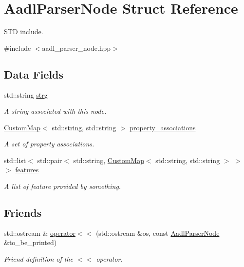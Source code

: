 \hypertarget{structAadlParserNode}{}\section{Aadl\+Parser\+Node Struct Reference}
\label{structAadlParserNode}


S\+TD include.  




{\ttfamily \#include $<$aadl\+\_\+parser\+\_\+node.\+hpp$>$}

\subsection*{Data Fields}
\begin{DoxyCompactItemize}
\item 
std\+::string \hyperlink{structAadlParserNode_a1818540477de82becd8229345b908343}{strg}
\begin{DoxyCompactList}\small\item\em A string associated with this node. \end{DoxyCompactList}\item 
\hyperlink{custom__map_8hpp_a18ca01763abbe3e5623223bfe5aaac6b}{Custom\+Map}$<$ std\+::string, std\+::string $>$ \hyperlink{structAadlParserNode_a2b91ce4340afee28bf9f24338ff42d55}{property\+\_\+associations}
\begin{DoxyCompactList}\small\item\em A set of property associations. \end{DoxyCompactList}\item 
std\+::list$<$ std\+::pair$<$ std\+::string, \hyperlink{custom__map_8hpp_a18ca01763abbe3e5623223bfe5aaac6b}{Custom\+Map}$<$ std\+::string, std\+::string $>$ $>$ $>$ \hyperlink{structAadlParserNode_a26f18c15d484fef9b2ea0e281a4c9cd0}{features}
\begin{DoxyCompactList}\small\item\em A list of feature provided by something. \end{DoxyCompactList}\end{DoxyCompactItemize}
\subsection*{Friends}
\begin{DoxyCompactItemize}
\item 
std\+::ostream \& \hyperlink{structAadlParserNode_a9c1f3476b5d2061d5220233a54ea4e72}{operator$<$$<$} (std\+::ostream \&os, const \hyperlink{structAadlParserNode}{Aadl\+Parser\+Node} \&to\+\_\+be\+\_\+printed)
\begin{DoxyCompactList}\small\item\em Friend definition of the $<$$<$ operator. \end{DoxyCompactList}\end{DoxyCompactItemize}


